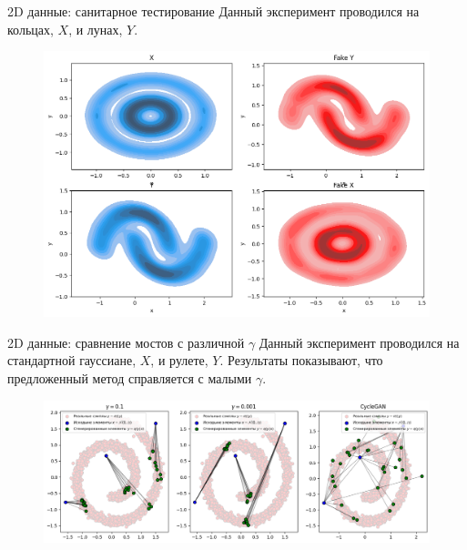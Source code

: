 \documentclass{beamer}
\begin{document}
\begin{frame}{2D данные: санитарное тестирование}
    Данный эксперимент проводился на кольцах, $X$, и лунах, $Y$.
    \begin{figure}
        \centering
        \includegraphics[width=0.9\linewidth]{slides//4th//figures/2d_results.png}
    \end{figure}
\end{frame}


\begin{frame}{2D данные: сравнение мостов с различной $\gamma$}
    Данный эксперимент проводился на стандартной гауссиане, $X$, и рулете, $Y$. Результаты показывают, что предложенный метод справляется с малыми $\gamma$.
    \begin{figure}
        \centering
        \includegraphics[width=1\linewidth]{slides//4th//figures/2d_gamma.png}
    \end{figure}
\end{frame}
\end{document}
